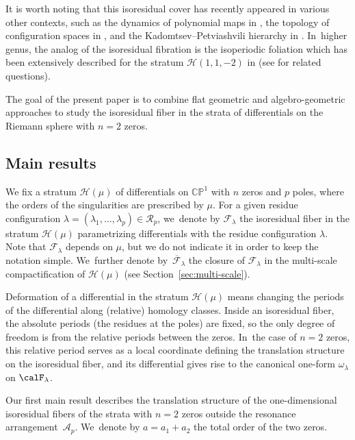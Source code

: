 It is worth noting that this isoresidual cover has recently appeared in various other contexts, such as the dynamics of polynomial maps in \cite{Sugiyama}, the topology of configuration spaces in \cite{SaBraid}, and the Kadomtsev--Petviashvili hierarchy in \cite{BuRoCoun}. In~higher genus, the analog of the isoresidual fibration is the isoperiodic foliation which has been extensively described for the stratum $\mathcal{H}(1,1,-2)$ in \cite{FaTaZa} (see \cite{KLS,CMDisoper,BGPA} for related questions).

The goal of the present paper is to combine flat geometric and algebro-geometric approaches to study the isoresidual fiber in the strata of differentials on the Riemann sphere with $n=2$ zeros.

\subsection{Main results}

We fix a stratum $\mathcal{H}(\mu)$ of differentials on $\mathbb{CP}^1$ with $n$ zeros and $p$ poles, where the orders of the singularities are prescribed by $\mu$. For a given residue configuration $\lambda=(\lambda_{1},\dots,\lambda_{p}) \in \mathcal{R}_{p}$, we~denote by $\mathcal{F}_{\lambda}$ the isoresidual fiber in the stratum $\mathcal{H}(\mu)$ parametrizing differentials with the residue configuration $\lambda$. Note that $\mathcal{F}_{\lambda}$ depends on $\mu$, but we do not indicate it in order to keep the notation simple. We~further denote by~$\overline{\mathcal{F}}_{\lambda}$ the closure of $\mathcal{F}_{\lambda}$ in the multi-scale compactification of $\mathcal{H}(\mu)$ (see Section~\ref{sec:multi-scale}).

Deformation of a differential in the stratum $\mathcal{H}(\mu)$ means changing the periods of the differential along (relative) homology classes. Inside an isoresidual fiber, the absolute periods (\ie the residues at the poles) are fixed, so the only degree of freedom is from the relative periods between the zeros. In~the case of $n=2$ zeros, this relative period serves as a local coordinate defining the translation structure on the isoresidual fiber, and its differential gives rise to the canonical one-form $\omega_{\lambda}$ on $\calF_{\lambda}$.

Our first main result describes the translation structure of the one-dimensional isoresidual fibers of the strata with $n=2$ zeros outside the resonance arrangement~$\mathcal{A}_{p}$. We~denote by $a = a_{1}+a_{2}$ the total order of the two zeros.

